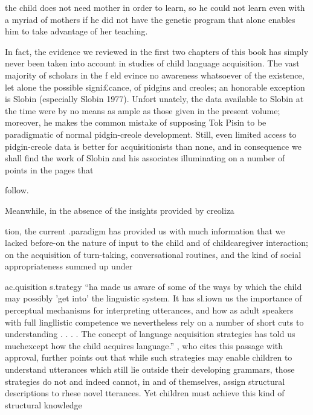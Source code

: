 
the child does not need mother in order to learn, so he could not learn even with a myriad of mothers if he did not have the genetic program that alone enables him to take advantage of her teaching.

In fact, the evidence we reviewed in the first two chapters of this book has simply never been taken into account in studies of child language acquisition. The vast majority of scholars in the f eld evince no awareness whatsoever of the existence, let alone the possible signi£cance, of pidgins and creoles; an honorable exception is Slobin (especially Slobin 1977). Unfort unately, the data available to Slobin at the time were by no means as ample as those given in the present volume; moreover, he makes the common mistake of supposing Tok Pisin to be paradigmatic of normal pidgin-creole development. Still, even limited access to pidgin-creole data is better for acquisitionists than none, and in consequence we shall find the work of Slobin and his associates illuminating on a number of points in the pages that

follow.

Meanwhile, in the absence of the insights provided by creoliza\-

tion, the current .paradigm has provided us with much information that we lacked before{}-on the nature of input to the child and of child\-caregiver interaction; on the acquisition of turn-taking, conversational routines, and the kind of social appropriateness summed up under


{\textquotedbl}ac.quisition s.trategy{\textquotedbl} ``ha made us aware of some of the ways by which the child may possibly 'get into' the linguistic system. It has sl.iown us the importance of perceptual mechanisms for interpreting utterances, and how as adult speakers with full lingllistic competence we nevertheless rely on a number of short cuts to understanding . . . . The concept of language acquisition strategies has told us much\-except how the child acquires language.'' \citet{Bowerman1979} , who cites this passage with approval, further points out that while such strategies may enable children to understand utterances which still lie outside their developing grammars, those strategies do not and indeed cannot, in and of themselves, assign structural descriptions to rhese novel tterances. Yet children must achieve this kind of structural knowledge

